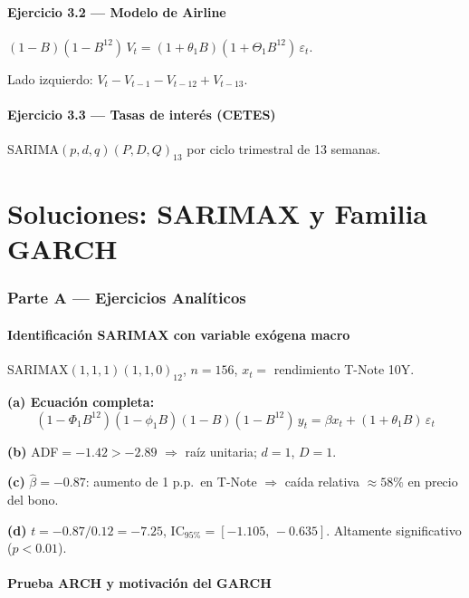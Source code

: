 \documentclass[12pt,letterpaper]{article}
\begin{document}
\subsection*{Ejercicio 3.2 --- Modelo de Airline}

$(1-B)(1-B^{12})\,V_t=(1+\theta_1 B)(1+\Theta_1 B^{12})\,\varepsilon_t$.

Lado izquierdo: $V_t-V_{t-1}-V_{t-12}+V_{t-13}$.

\subsection*{Ejercicio 3.3 --- Tasas de inter\'es (CETES)}

SARIMA$(p,d,q)(P,D,Q)_{13}$ por ciclo trimestral de 13 semanas.

\part{Soluciones: SARIMAX y Familia GARCH}

\section{Parte A --- Ejercicios Anal\'iticos}

\subsection{Identificaci\'on SARIMAX con variable ex\'ogena macro}

SARIMAX$(1,1,1)(1,1,0)_{12}$, $n=156$, $x_t=$ rendimiento T-Note 10Y.

\textbf{(a) Ecuaci\'on completa:}
\[
  (1-\Phi_1 B^{12})(1-\phi_1 B)(1-B)(1-B^{12})\,y_t
  =\beta x_t+(1+\theta_1 B)\,\varepsilon_t
\]

\textbf{(b)} ADF$=-1.42>-2.89$ $\Rightarrow$ ra\'iz unitaria; $d=1$, $D=1$.

\textbf{(c)} $\hat{\beta}=-0.87$: aumento de 1 p.p.\ en T-Note
$\Rightarrow$ ca\'ida relativa $\approx 58\%$ en precio del bono.

\textbf{(d)}
$t=-0.87/0.12=-7.25$, $\mathrm{IC}_{95\%}=[-1.105,\,-0.635]$. Altamente
significativo ($p<0.01$).

\subsection{Prueba ARCH y motivaci\'on del GARCH}
\end{document}
